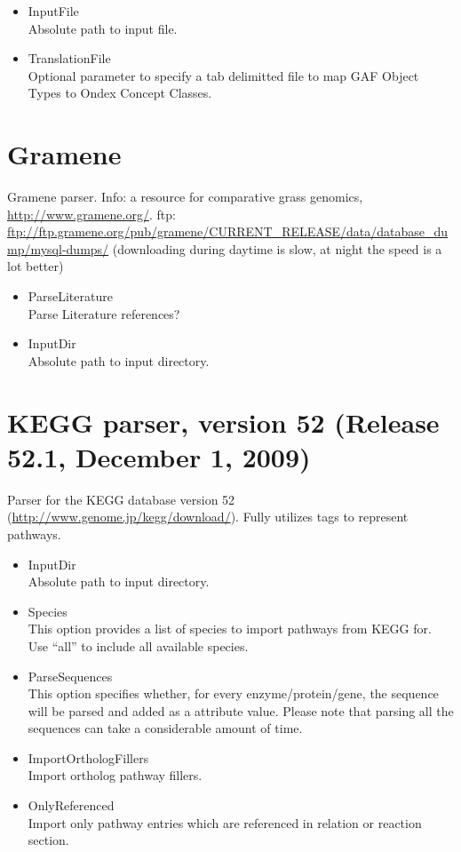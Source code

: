 \begin{itemize}
  \item{InputFile}\\
  Absolute path to input file.
  \item{TranslationFile}\\
  Optional parameter to specify a tab delimitted file to map GAF Object Types to Ondex Concept Classes.
\end{itemize}
    
\section{Gramene}
Gramene parser.
Info: a resource for comparative grass genomics, \url{http://www.gramene.org/}. 
ftp: \url{ftp://ftp.gramene.org/pub/gramene/CURRENT_RELEASE/data/database_dump/mysql-dumps/}
(downloading during daytime is slow, at night the speed is a lot better)
\begin{itemize}
  \item{ParseLiterature}\\
  Parse Literature references?
  \item{InputDir}\\
  Absolute path to input directory.
\end{itemize}
    
\section{KEGG parser, version 52 (Release 52.1, December 1, 2009)}
Parser for the KEGG database version 52 (\url{http://www.genome.jp/kegg/download/}). 
Fully utilizes tags to represent pathways.
\begin{itemize}
  \item{InputDir}\\
  Absolute path to input directory.
  \item{Species}\\
  This option provides a list of species to import pathways from KEGG for.
  Use ``all'' to include all available species.
  \item{ParseSequences}\\
  This option specifies whether, for every enzyme/protein/gene, the sequence will be parsed and added as a attribute value.
  Please note that parsing all the sequences can take a considerable amount of time.
  \item{ImportOrthologFillers}\\
  Import ortholog pathway fillers.
  \item{OnlyReferenced}\\
  Import only pathway entries which are referenced in relation or reaction section.
\end{itemize}
    
